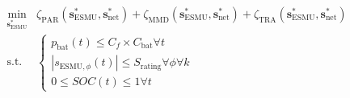 \begin{equation}
\begin{split}
	\min_{\textbf{s}^*_\text{ESMU}} & \zeta_\text{PAR}(\textbf{s}^*_\text{ESMU}, \textbf{s}^*_\text{net}) + \zeta_\text{MMD}(\textbf{s}^*_\text{ESMU}, \textbf{s}^*_\text{net}) + \zeta_\text{TRA}(\textbf{s}^*_\text{ESMU}, \textbf{s}^*_\text{net})\\
	\text{s.t. }& \begin{cases}
		p_\text{bat}(t) \leq C_f\times C_\text{bat} \forall t\\
		\left|s_{\text{ESMU},\phi}(t)\right| \leq S_\text{rating} \forall \phi \forall k\\
		0 \leq SOC(t) \leq 1 \forall t
	\end{cases}
\end{split}
\label{ch1:equ:scheduling-cost}
\end{equation}